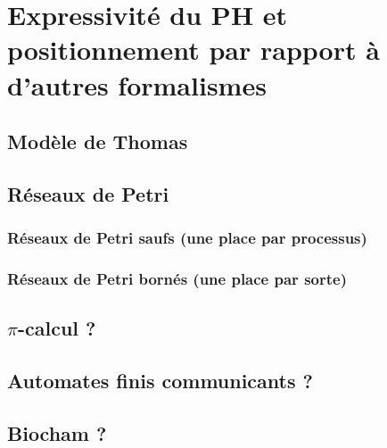 \documentclass[12pt,french,francais,nofancyChapter,nofancyPart]{these-LUNAM}
\theoremstyle{definition}
\theoremstyle{remark}
\begin{document}


\chapter{Expressivité du PH et positionnement par rapport à d'autres formalismes}
  \section{Modèle de Thomas}
  \section{Réseaux de Petri}
    \subsection{Réseaux de Petri saufs (une place par processus)}
    \subsection{Réseaux de Petri bornés (une place par sorte)}
  \section{$\pi$-calcul ?}
  \section{Automates finis communicants ?}
  \section{Biocham ?}




  
%

\end{document}
